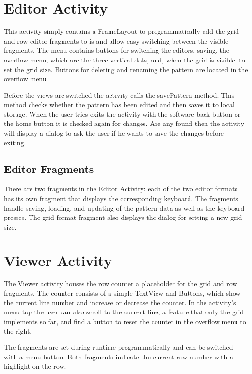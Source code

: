 \section{Editor Activity}
This activity simply contains a FrameLayout to programmatically add the grid and row editor fragments to is and allow easy switching between the visible fragments. The menu contains buttons for switching the editors, saving, the overflow menu, which are the three vertical dots, and, when the grid is visible, to set the grid size. Buttons for deleting and renaming the pattern are located in the overflow menu.

Before the views are switched the activity calls the savePattern method. This method checks whether the pattern has been edited and then saves it to local storage.
When the user tries exits the activity with the software back button or the home button it is checked again for changes. Are any found then the activity will display a dialog to ask the user if he wants to save the changes before exiting.

\subsection{Editor Fragments}
There are two fragments in the Editor Activity: each of the two editor formats has its own fragment that displays the corresponding keyboard. The fragments handle saving, loading, and updating of the pattern data as well as the keyboard presses.
The grid format fragment also displays the dialog for setting a new grid size.

\section{Viewer Activity}
The Viewer activity houses the row counter a placeholder for the grid and row fragments. The counter consists of a simple TextView and Buttons, which show the current line number and increase or decrease the counter. In the activity’s menu top the user can also scroll to the current line, a feature that only the grid implements so far, and find a button to reset the counter in the overflow menu to the right.

The fragments are set during runtime programmatically and can be switched with a menu button. Both fragments indicate the current row number with a highlight on the row.